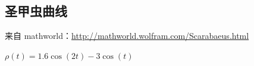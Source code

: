 \newpage
\subsection{圣甲虫曲线}
来自 mathworld：\url{http://mathworld.wolfram.com/Scarabaeus.html}

$\rho(t)=1.6\cos(2t)-3\cos(t) $

\begin{center}
\begin{tkzexample}[]
\end{tkzexample}
\end{center}

\endinput
